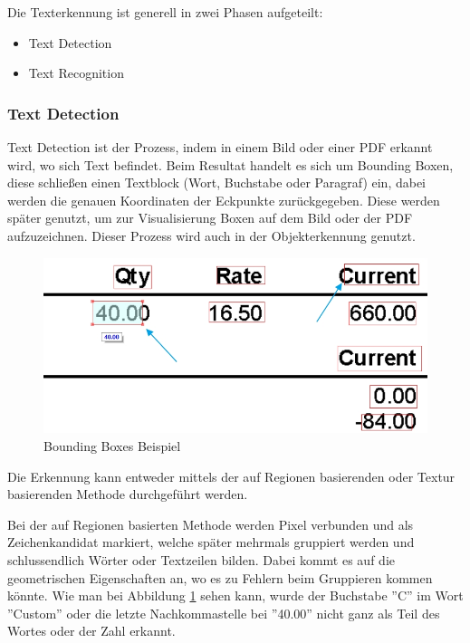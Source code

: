 Die Texterkennung ist generell in zwei Phasen aufgeteilt:

\begin{itemize}
    \item Text Detection
    \item Text Recognition
\end{itemize}

\subsubsection{Text Detection} Text Detection ist der Prozess, indem in einem Bild oder einer PDF erkannt wird, wo sich Text befindet. Beim Resultat handelt es sich um Bounding Boxen, diese schließen einen Textblock (Wort, Buchstabe oder Paragraf) ein, dabei werden die genauen Koordinaten der Eckpunkte zurückgegeben. Diese werden später genutzt, um zur Visualisierung Boxen auf dem Bild oder der PDF aufzuzeichnen. Dieser Prozess wird auch in der Objekterkennung genutzt.

\begin{figure}[H]
    \includegraphics[scale=0.5]{sections/machine-learning/images/bounding-boxes.png}
    \caption{Bounding Boxes Beispiel}
    \label{fig:bounding-boxes}
\end{figure}

Die Erkennung kann entweder mittels der auf Regionen basierenden oder Textur basierenden Methode durchgeführt werden.

Bei der auf Regionen basierten Methode werden Pixel verbunden und als Zeichenkandidat markiert, welche später mehrmals gruppiert werden und schlussendlich Wörter oder Textzeilen bilden. Dabei kommt es auf die geometrischen Eigenschaften an, wo es zu Fehlern beim Gruppieren kommen könnte. Wie man bei Abbildung \ref{fig:bounding-boxes} sehen kann, wurde der Buchstabe ''C'' im Wort ''Custom'' oder die letzte Nachkommastelle bei ''40.00'' nicht ganz als Teil des Wortes oder der Zahl erkannt. \cite{OCR3:online}

